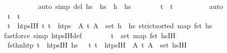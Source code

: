 \begin{isabellebody}
\ \ \ \ \ \ \ \ \isamarkupfalse%
\ {\isacharparenleft}{\kern0pt}auto\ simp\ del{\isacharcolon}{\kern0pt}\ {\isacartoucheopen}hs\ {\isacharequal}{\kern0pt}\ hs{}\ {\isacharat}{\kern0pt}\ h\ {\isacharhash}{\kern0pt}\ hs{}{\isacartoucheclose}{\isacharparenright}{\kern0pt}\isanewline
\ \ \ \ \ \ \isamarkupfalse%
\ {\isachardoublequoteopen}t\ {\isacharless}{\kern0pt}\ t{\isacharprime}{\kern0pt}{\isacharprime}{\kern0pt}{\isacharprime}{\kern0pt}{\isachardoublequoteclose}\isanewline
\ \ \ \ \ \ \ \ \isamarkupfalse%
\ auto\isanewline
\ \ \ \ \ \ \isamarkupfalse%
\ \isamarkupfalse%
\ {\isachardoublequoteopen}t{\isacharprime}{\kern0pt}\ {\isacharless}{\kern0pt}\ t\isanewline
\ \ \ \ \ \ \ \ \isamarkupfalse%
\ {\isacartoucheopen}t\ {\isasymin}\ htps{\isacharunderscore}{\kern0pt}IH{\isacartoucheclose}\ {\isacartoucheopen}{\isasymAnd}t{\isachardot}{\kern0pt}\ t\ {\isasymin}\ htps\ {\isasymLongrightarrow}\ {\isasymexists}A{\isachardot}{\kern0pt}\ {\isacharparenleft}{\kern0pt}t{\isacharcomma}{\kern0pt}\ A{\isacharparenright}{\kern0pt}\ {\isasymin}\ set\ {\isacharparenleft}{\kern0pt}h\ {\isacharhash}{\kern0pt}\ hs{}{\isacharparenright}{\kern0pt}{\isacartoucheclose}\ {\isacartoucheopen}strict{\isacharunderscore}{\kern0pt}sorted\ {\isacharparenleft}{\kern0pt}map\ fst\ hs{\isacharparenright}{\kern0pt}{\isacartoucheclose}\isanewline
\ \ \ \ \ \ \ \ \isamarkupfalse%
{\isacharparenleft}{\kern0pt}fastforce\ simp{\isacharcolon}{\kern0pt}\ htps{\isacharunderscore}{\kern0pt}IH{\isacharunderscore}{\kern0pt}def{\isacharparenright}{\kern0pt}\isanewline
\ \ \ \ \ \ \isamarkupfalse%
\ {\isachardoublequoteopen}t\ {\isasymin}\ set\ {\isacharparenleft}{\kern0pt}map\ fst\ hs{\isacharunderscore}{\kern0pt}IH{\isacharparenright}{\kern0pt}{\isachardoublequoteclose}\isanewline
\ \ \ \ \ \ \ \ \isamarkupfalse%
\ fst{\isacharunderscore}{\kern0pt}h{}{\isacharprime}{\kern0pt}{\isacharunderscore}{\kern0pt}n{\isacharunderscore}{\kern0pt}htp\ {\isacartoucheopen}t\ {\isasymin}\ htps{\isacharunderscore}{\kern0pt}IH{\isacartoucheclose}\ {\isacartoucheopen}hs{}\ {\isacharequal}{\kern0pt}\ {\isacharbrackleft}{\kern0pt}{\isacharbrackright}{\kern0pt}{\isacartoucheclose}\ {\isacartoucheopen}{\isasymAnd}t{\isacharprime}{\kern0pt}{\isacharprime}{\kern0pt}{\isachardot}{\kern0pt}\ t{\isacharprime}{\kern0pt}{\isacharprime}{\kern0pt}\ {\isasymin}\ htps{\isacharunderscore}{\kern0pt}IH\ {\isasymLongrightarrow}\ {\isasymexists}A{\isachardot}{\kern0pt}\ {\isacharparenleft}{\kern0pt}t{\isacharprime}{\kern0pt}{\isacharprime}{\kern0pt}{\isacharcomma}{\kern0pt}\ A{\isacharparenright}{\kern0pt}\ {\isasymin}\ set\ hs{\isacharunderscore}{\kern0pt}IH{\isacartoucheclose}\isanewline

\end{isabellebody}
